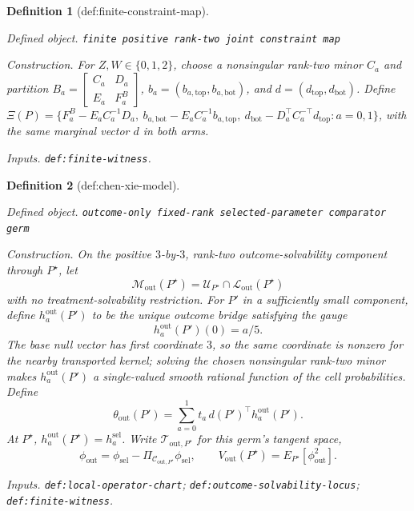 \documentclass{article}
\newtheorem{definition}{Definition}
\begin{document}
\begin{definition}[def:finite-constraint-map]\label{def:finite-constraint-map}
\par\smallskip\noindent\emph{Defined object.} \texttt{finite positive rank-\allowbreak{}two joint constraint map}
\par\smallskip\noindent\emph{Construction.} For \(Z,W\in\{0,1,2\}\), choose a nonsingular rank-two minor \(C_a\) and partition \(B_a=\left[\begin{smallmatrix}C_a&D_a\\E_a&F_a^{B}\end{smallmatrix}\right]\), \(b_a=(b_{a,\mathrm{top}},b_{a,\mathrm{bot}})\), and \(d=(d_{\mathrm{top}},d_{\mathrm{bot}})\). Define \(\Xi(P)=\{F_a^{B}-E_aC_a^{-1}D_a,\ b_{a,\mathrm{bot}}-E_aC_a^{-1}b_{a,\mathrm{top}},\ d_{\mathrm{bot}}-D_a^\top C_a^{-\top}d_{\mathrm{top}}:a=0,1\}\), with the same marginal vector \(d\) in both arms.
\par\smallskip\noindent\emph{Inputs.} \texttt{def:\allowbreak{}finite-\allowbreak{}witness}.
\end{definition}

\begin{definition}[def:chen-xie-model]\label{def:chen-xie-model}
\par\smallskip\noindent\emph{Defined object.} \texttt{outcome-\allowbreak{}only fixed-\allowbreak{}rank selected-\allowbreak{}parameter comparator germ}
\par\smallskip\noindent\emph{Construction.} On the positive \(3\)-by-\(3\), rank-two outcome-solvability component through \(P^\star\), let
\[
\mathcal M_{\mathrm{out}}(P^\star)=\mathcal U_{P^\star}\cap\mathcal L_{\mathrm{out}}(P^\star)
\]
with no treatment-solvability restriction.  For \(P'\) in a sufficiently small component, define \(h^{\mathrm{out}}_a(P')\) to be the unique outcome bridge satisfying the gauge
\[
h^{\mathrm{out}}_a(P')(0)=a/5.
\]
The base null vector has first coordinate \(3\), so the same coordinate is nonzero for the nearby transported kernel; solving the chosen nonsingular rank-two minor makes \(h^{\mathrm{out}}_a(P')\) a single-valued smooth rational function of the cell probabilities. Define
\[
\theta_{\mathrm{out}}(P')=\sum_{a=0}^1t_a\,d(P')^\top h^{\mathrm{out}}_a(P').
\]
At \(P^\star\), \(h^{\mathrm{out}}_a(P^\star)=h_a^{\mathrm{sel}}\).  Write \(\mathcal T_{\mathrm{out},P^\star}\) for this germ's tangent space,
\[
\phi_{\mathrm{out}}=\phi_{\mathrm{sel}}-\Pi_{\mathcal C_{\mathrm{out},P^\star}}\phi_{\mathrm{sel}},
\qquad
V_{\mathrm{out}}(P^\star)=E_{P^\star}[\phi_{\mathrm{out}}^2].
\]
\par\smallskip\noindent\emph{Inputs.} \texttt{def:\allowbreak{}local-\allowbreak{}operator-\allowbreak{}chart}; \texttt{def:\allowbreak{}outcome-\allowbreak{}solvability-\allowbreak{}locus}; \texttt{def:\allowbreak{}finite-\allowbreak{}witness}.
\end{definition}
\end{document}
